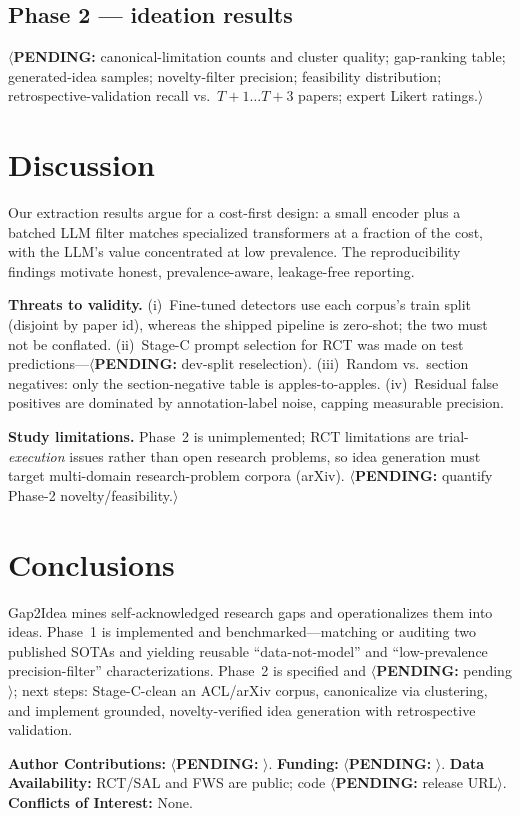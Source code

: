 \documentclass[10pt,a4paper]{article}
\newcommand{\pending}[1]{\textcolor{red!80!black}{$\langle$\textbf{PENDING:} #1$\rangle$}}
\begin{document}
\subsection{Phase 2 --- ideation results}
\pending{canonical-limitation counts and cluster quality; gap-ranking table; generated-idea
samples; novelty-filter precision; feasibility distribution; retrospective-validation recall
vs.\ $T{+}1\ldots T{+}3$ papers; expert Likert ratings.}

\section{Discussion}
Our extraction results argue for a cost-first design: a small encoder plus a batched LLM filter
matches specialized transformers at a fraction of the cost, with the LLM's value concentrated at
low prevalence. The reproducibility findings motivate honest, prevalence-aware, leakage-free
reporting.

\textbf{Threats to validity.} (i)~Fine-tuned detectors use each corpus's train split (disjoint by
paper id), whereas the shipped pipeline is zero-shot; the two must not be conflated.
(ii)~Stage-C prompt selection for RCT was made on test predictions---\pending{dev-split
reselection}. (iii)~Random vs.\ section negatives: only the section-negative table is
apples-to-apples. (iv)~Residual false positives are dominated by annotation-label noise, capping
measurable precision.

\textbf{Study limitations.} Phase~2 is unimplemented; RCT limitations are trial-\emph{execution}
issues rather than open research problems, so idea generation must target multi-domain
research-problem corpora (arXiv). \pending{quantify Phase-2 novelty/feasibility.}

\section{Conclusions}
Gap2Idea mines self-acknowledged research gaps and operationalizes them into ideas. Phase~1 is
implemented and benchmarked---matching or auditing two published SOTAs and yielding reusable
``data-not-model'' and ``low-prevalence precision-filter'' characterizations. Phase~2 is
specified and \pending{pending}; next steps: Stage-C-clean an ACL/arXiv corpus, canonicalize via
clustering, and implement grounded, novelty-verified idea generation with retrospective
validation.

\vspace{6pt}
\small
\noindent\textbf{Author Contributions:} \pending{}.\quad
\textbf{Funding:} \pending{}.\quad
\textbf{Data Availability:} RCT/SAL and FWS are public; code \pending{release URL}.\quad
\textbf{Conflicts of Interest:} None.



\end{document}
